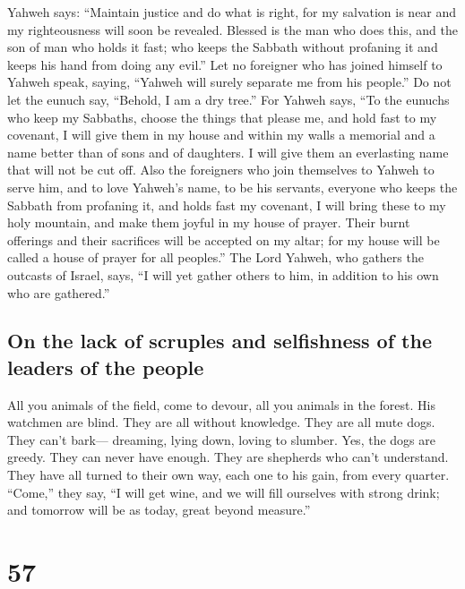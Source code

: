  Yahweh says: ``Maintain justice and do what is right, for
my salvation is near and my righteousness will soon be revealed.
 Blessed is the man who does this, and the son of man who
holds it fast; who keeps the Sabbath without profaning it and keeps his
hand from doing any evil.''  Let no foreigner who has
joined himself to Yahweh speak, saying, ``Yahweh will surely separate me
from his people.'' Do not let the eunuch say, ``Behold, I am a dry
tree.''  For Yahweh says, ``To the eunuchs who keep my
Sabbaths, choose the things that please me, and hold fast to my
covenant,  I will give them in my house and within my
walls a memorial and a name better than of sons and of daughters. I will
give them an everlasting name that will not be cut off. 
Also the foreigners who join themselves to Yahweh to serve him, and to
love Yahweh's name, to be his servants, everyone who keeps the Sabbath
from profaning it, and holds fast my covenant,  I will
bring these to my holy mountain, and make them joyful in my house of
prayer. Their burnt offerings and their sacrifices will be accepted on
my altar; for my house will be called a house of prayer for all
peoples.''  The Lord Yahweh, who gathers the outcasts of
Israel, says, ``I will yet gather others to him, in addition to his own
who are gathered.''

\hypertarget{on-the-lack-of-scruples-and-selfishness-of-the-leaders-of-the-people}{%
\subsection{On the lack of scruples and selfishness of the leaders of
the
people}\label{on-the-lack-of-scruples-and-selfishness-of-the-leaders-of-the-people}}

 All you animals of the field, come to devour, all you
animals in the forest.  His watchmen are blind. They are
all without knowledge. They are all mute dogs. They can't bark---
dreaming, lying down, loving to slumber.  Yes, the dogs
are greedy. They can never have enough. They are shepherds who can't
understand. They have all turned to their own way, each one to his gain,
from every quarter.  ``Come,'' they say, ``I will get
wine, and we will fill ourselves with strong drink; and tomorrow will be
as today, great beyond measure.''

\hypertarget{section-56}{%
\section{57}\label{section-56}}

